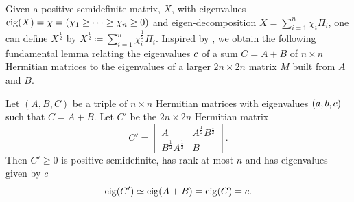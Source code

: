 \documentclass[notitlepage, 10pt]{article}
\begin{document}
Given a positive semidefinite matrix, $X$, with eigenvalues $\operatorname{eig}(X) = \chi = (\chi_1 \geq \cdots \geq \chi_n \geq 0)$ and eigen-decomposition $X = {\sum}_{i=1}^{n} \chi_i \Pi_i$, one can define $X^{\frac{1}{2}}$ by $X^{\frac{1}{2}} \coloneqq {\sum}_{i=1}^{n} \chi_i^{\frac{1}{2}} \Pi_i$.
Inspired by \cite[Theorem IV.2.13]{bhatia1997matrix}, we obtain the following fundamental lemma relating the eigenvalues $c$ of a sum $C=A+B$ of $n\times n$ Hermitian matrices to the eigenvalues of a larger $2n\times 2n$ matrix $M$ built from $A$ and $B$.
\begin{lem}
    \label{lem:trigonal_block}
    Let $(A, B, C)$ be a triple of $n \times n$ Hermitian matrices with eigenvalues $(a, b, c)$ such that $C=A+B$.
    Let $C'$ be the $2n \times 2n$ Hermitian matrix
    \begin{equation}
        C' = \begin{bmatrix}
            A & A^{\frac{1}{2}}B^{\frac{1}{2}} \\
            B^{\frac{1}{2}}A^{\frac{1}{2}} & B
        \end{bmatrix}.
    \end{equation}
    Then $C' \geq 0$ is positive semidefinite, has rank at most $n$ and has eigenvalues given by $c$
    \begin{equation}
        \operatorname{eig}(C') \simeq \operatorname{eig}(A+B) = \operatorname{eig}(C) = c.
    \end{equation}
\end{lem}
\end{document}
